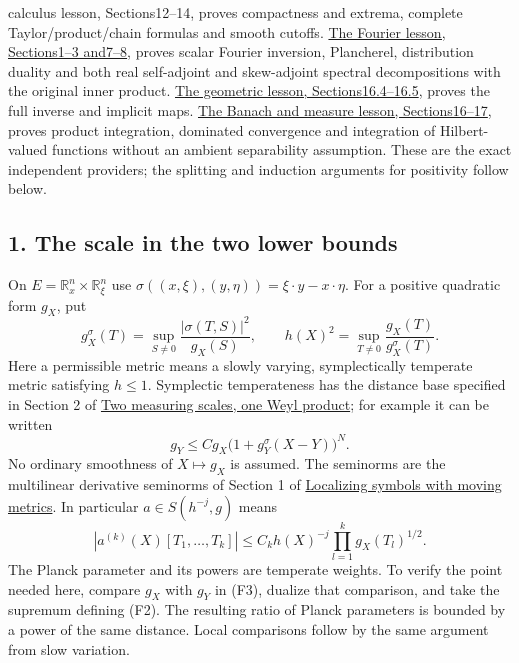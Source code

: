 \documentclass[
  11pt,
]{article}
\makeatletter
\let\ReaderOriginalAnchorStart\hyper@anchorstart
\let\ReaderOriginalAnchorEnd\hyper@anchorend
\let\ReaderPendingAliases\@empty
\def\ReaderArmAliases#1{\gdef\ReaderPendingAliases{#1}}
\def\hyper@anchorstart#1{\ReaderIfNativeAnchorTF{#1}{\ReaderPendingAliases\global\let\ReaderPendingAliases\@empty}{}\ReaderOriginalAnchorStart{#1}}
\makeatother
\begin{document}
\begin{itemize}
{  calculus lesson, Sections12--14}, proves compactness and extrema,
  complete Taylor/product/chain formulas and smooth cutoffs.
  \href{prerequisite-bridges.pdf}{The Fourier lesson,
  Sections1--3 and7--8}, proves scalar Fourier inversion, Plancherel,
  distribution duality and both real self-adjoint and skew-adjoint
  spectral decompositions with the original inner product.
  \href{geometric-microlocal-calculus.pdf}{The
  geometric lesson, Sections16.4--16.5}, proves the full inverse and
  implicit maps.
  \href{banach-foundation-bridges.pdf}{The Banach
  and measure lesson, Sections16--17}, proves product integration,
  dominated convergence and integration of Hilbert-valued functions
  without an ambient separability assumption. These are the exact
  independent providers; the splitting and induction arguments for
  positivity follow below.
\end{itemize}

\ReaderArmAliases{\ReaderOriginalAnchorStart{AN03-SFP-001}\ReaderOriginalAnchorEnd\begingroup\expandafter\def\csname @currentHref\endcsname{AN03-SFP-001}\label{AN03-SFP-001}\endgroup\ReaderOriginalAnchorStart{an03-sfp-001-the-scale-in-the-two-lower-bounds}\ReaderOriginalAnchorEnd\begingroup\expandafter\def\csname @currentHref\endcsname{an03-sfp-001-the-scale-in-the-two-lower-bounds}\label{an03-sfp-001-the-scale-in-the-two-lower-bounds}\endgroup\ReaderOriginalAnchorStart{1-the-scale-in-the-two-lower-bounds}\ReaderOriginalAnchorEnd\begingroup\expandafter\def\csname @currentHref\endcsname{1-the-scale-in-the-two-lower-bounds}\label{1-the-scale-in-the-two-lower-bounds}\endgroup\ReaderOriginalAnchorStart{the-scale-in-the-two-lower-bounds}\ReaderOriginalAnchorEnd}
\subsection{1. The scale in the two lower
bounds}\label{the-scale-in-the-two-lower-bounds}

On \(E=\mathbb R_x^n\times\mathbb R_\xi^n\) use
\(\sigma((x,\xi),(y,\eta))=\xi\cdot y-x\cdot\eta\). For a positive
quadratic form \(g_X\), put \[
g_X^\sigma(T)=\sup_{S\ne0}\frac{|\sigma(T,S)|^2}{g_X(S)},
\qquad h(X)^2=\sup_{T\ne0}\frac{g_X(T)}{g_X^\sigma(T)}.
\tag{F2}
\] Here a permissible metric means a slowly varying, symplectically
temperate metric satisfying \(h\leq1\). Symplectic temperateness has the
distance base specified in Section 2 of
\href{weyl-metric-products.pdf}{Two measuring scales, one Weyl product};
for example it can be written \[
g_Y\leq Cg_X\bigl(1+g_Y^\sigma(X-Y)\bigr)^N.
\tag{F3}
\] No ordinary smoothness of \(X\mapsto g_X\) is assumed. The seminorms
are the multilinear derivative seminorms of Section 1 of
\href{metric-localization.pdf}{Localizing symbols with moving metrics}.
In particular \(a\in S(h^{-j},g)\) means \[
|a^{(k)}(X)[T_1,\ldots,T_k]|
 \leq C_k h(X)^{-j}\prod_{l=1}^k g_X(T_l)^{1/2}.
\tag{F4}
\] The Planck parameter and its powers are temperate weights. To verify
the point needed here, compare \(g_X\) with \(g_Y\) in (F3), dualize
that comparison, and take the supremum defining (F2). The resulting
ratio of Planck parameters is bounded by a power of the same distance.
Local comparisons follow by the same argument from slow variation.
\end{document}

